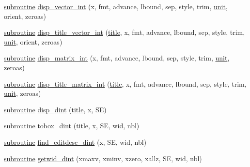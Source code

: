 \begin{DoxyCompactItemize}
\item 
\hyperlink{M__stopwatch_83_8txt_acfbcff50169d691ff02d4a123ed70482}{subroutine} \hyperlink{namespacem__display_abbb9f5e78b3998c8fa9774d594152dcc}{disp\+\_\+vector\+\_\+int} (x, fmt, advance, lbound, sep, style, trim, \hyperlink{M__stopwatch_83_8txt_a5cbef30eb7c0d734bd82f5a7ebea9aa7}{unit}, orient, zeroas)
\item 
\hyperlink{M__stopwatch_83_8txt_acfbcff50169d691ff02d4a123ed70482}{subroutine} \hyperlink{namespacem__display_a8393f81379778fc9d955bf1e0961aee1}{disp\+\_\+title\+\_\+vector\+\_\+int} (\hyperlink{print__watch_83_8txt_a15b5bd21156bb9fca6a755ab8c029a9c}{title}, x, fmt, advance, lbound, sep, style, trim, \hyperlink{M__stopwatch_83_8txt_a5cbef30eb7c0d734bd82f5a7ebea9aa7}{unit}, orient, zeroas)
\item 
\hyperlink{M__stopwatch_83_8txt_acfbcff50169d691ff02d4a123ed70482}{subroutine} \hyperlink{namespacem__display_a00d35e9c84ad3f0238e4598f09f79961}{disp\+\_\+matrix\+\_\+int} (x, fmt, advance, lbound, sep, style, trim, \hyperlink{M__stopwatch_83_8txt_a5cbef30eb7c0d734bd82f5a7ebea9aa7}{unit}, zeroas)
\item 
\hyperlink{M__stopwatch_83_8txt_acfbcff50169d691ff02d4a123ed70482}{subroutine} \hyperlink{namespacem__display_aa95be71bcd8730f4f01393ea6ede4bec}{disp\+\_\+title\+\_\+matrix\+\_\+int} (\hyperlink{print__watch_83_8txt_a15b5bd21156bb9fca6a755ab8c029a9c}{title}, x, fmt, advance, lbound, sep, style, trim, \hyperlink{M__stopwatch_83_8txt_a5cbef30eb7c0d734bd82f5a7ebea9aa7}{unit}, zeroas)
\item 
\hyperlink{M__stopwatch_83_8txt_acfbcff50169d691ff02d4a123ed70482}{subroutine} \hyperlink{namespacem__display_a0e150cc23de78529e22b17b1873a9e6e}{disp\+\_\+dint} (\hyperlink{print__watch_83_8txt_a15b5bd21156bb9fca6a755ab8c029a9c}{title}, x, SE)
\item 
\hyperlink{M__stopwatch_83_8txt_acfbcff50169d691ff02d4a123ed70482}{subroutine} \hyperlink{namespacem__display_a305dbf4f9072f9d1551a24c0f26ad508}{tobox\+\_\+dint} (\hyperlink{print__watch_83_8txt_a15b5bd21156bb9fca6a755ab8c029a9c}{title}, x, SE, wid, nbl)
\item 
\hyperlink{M__stopwatch_83_8txt_acfbcff50169d691ff02d4a123ed70482}{subroutine} \hyperlink{namespacem__display_ab6e1e0eb1c077b4d2a0c6698c78925a3}{find\+\_\+editdesc\+\_\+dint} (x, SE, wid, nbl)
\item 
\hyperlink{M__stopwatch_83_8txt_acfbcff50169d691ff02d4a123ed70482}{subroutine} \hyperlink{namespacem__display_a6d7287cccf11d65c1821020ef61c7992}{getwid\+\_\+dint} (xmaxv, xminv, xzero, xallz, SE, wid, nbl)

\end{DoxyCompactItemize}
